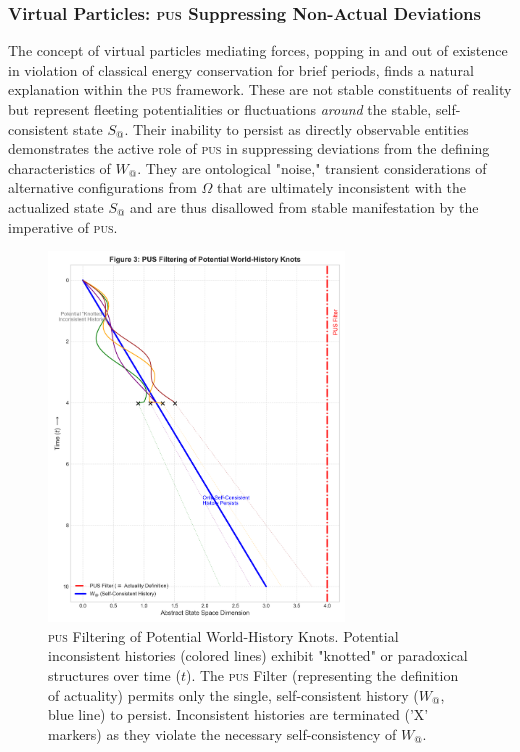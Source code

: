 \documentclass[11pt, a4paper]{article}
\makeatletter
\newcommand{\pus}{\textsc{pus}} %
\newcommand{\Wactual}{W_{@}} %
\newcommand{\Sactual}{S_{@}} %
\newcommand{\Omegaset}{\Omega} %
\makeatother
\begin{document}
\subsubsection{Virtual Particles: \pus{} Suppressing Non-Actual Deviations}
The concept of virtual particles mediating forces, popping in and out of existence in violation of classical energy conservation for brief periods, finds a natural explanation within the \pus{} framework. These are not stable constituents of reality but represent fleeting potentialities or fluctuations \textit{around} the stable, self-consistent state $\Sactual$. Their inability to persist as directly observable entities demonstrates the active role of \pus{} in suppressing deviations from the defining characteristics of $\Wactual$. They are ontological "noise," transient considerations of alternative configurations from $\Omegaset$ that are ultimately inconsistent with the actualized state $\Sactual$ and are thus disallowed from stable manifestation by the imperative of \pus.

\begin{figure}[htbp]
    \centering
    \includegraphics[width=0.7\textwidth]{figures/pus_figure3_knot_filter.png}
    \caption{\pus{} Filtering of Potential World-History Knots. Potential inconsistent histories (colored lines) exhibit "knotted" or paradoxical structures over time ($t$). The \pus{} Filter (representing the definition of actuality) permits only the single, self-consistent history ($\Wactual$, blue line) to persist. Inconsistent histories are terminated ('X' markers) as they violate the necessary self-consistency of $\Wactual$.}
    \label{fig:knots}
\end{figure}
\end{document}
